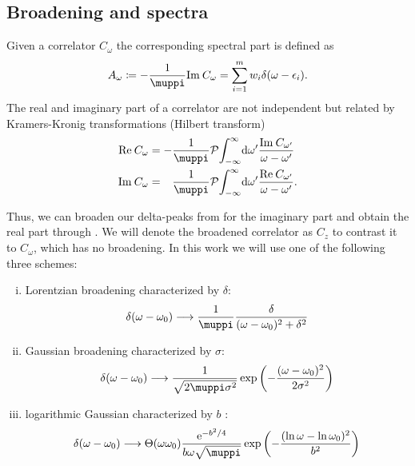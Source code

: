 \subsection{Broadening and spectra}

Given a correlator $C_\omega$ the corresponding spectral part is defined as
\begin{equation}
    A_\omega \coloneq -\frac{1}{\muppi}\Im C_\omega = \sum_{i=1}^m w_i \delta(\omega - \epsilon_i).
    \label{eq:spectral-part}
\end{equation}
The real and imaginary part of a correlator are not independent
but related by Kramers-Kronig transformations (Hilbert transform)
\begin{subequations}
    \begin{align}
        \Re C_\omega
         & =
        - \frac{1}{\muppi} \mathcal{P}\! \int_{-\infty}^\infty\! \md\omega'
        \frac{\Im C_{\omega'}}{\omega - \omega'}
        \label{eq:kramers-kroneg-real} \\
        \Im C_\omega
         & =
        \phantom{-} \frac{1}{\muppi} \mathcal{P}\! \int_{-\infty}^\infty\! \md\omega'
        \frac{\Re C_{\omega'}}{\omega - \omega'}.
        \label{eq:kramers-kronig-imag}
    \end{align}
\end{subequations}

Thus, we can broaden our delta-peaks from 
for the imaginary part and obtain the real part through .
We will denote the broadened correlator as $C_z$
to contrast it to $C_\omega$, which has no broadening.
In this work we will use one of the following three schemes:
\begin{enumerate}[(i)]
    \item Lorentzian broadening characterized by $\delta$:
          \label{item:lorentzian}
          \begin{equation}
              \delta(\omega - \omega_0)
              \longrightarrow
              \frac{1}{\muppi}\frac{\delta}{(\omega - \omega_0)^2 + \delta^2}
          \end{equation}
    \item Gaussian broadening characterized by $\sigma$:
          \label{item:gaussian}
          \begin{equation}
              \delta(\omega - \omega_0)
              \longrightarrow
              \frac{1}{\sqrt{2\muppi \sigma^2}}\exp\left(-\frac{(\omega - \omega_0)^2}{2\sigma^2}\right)
          \end{equation}
    \item logarithmic Gaussian characterized by $b$ \cite{Bulla2008}:
          \label{item:logarithmic-gaussian}
          \begin{equation}
              \delta(\omega - \omega_0)
              \longrightarrow
              \Theta(\omega\omega_0)\frac{\me^{-b^2/4}}{b\omega\sqrt{\muppi}}\exp\left(-\frac{(\ln\omega-\ln\omega_0)^2}{b^2}\right)
          \end{equation}
\end{enumerate}

